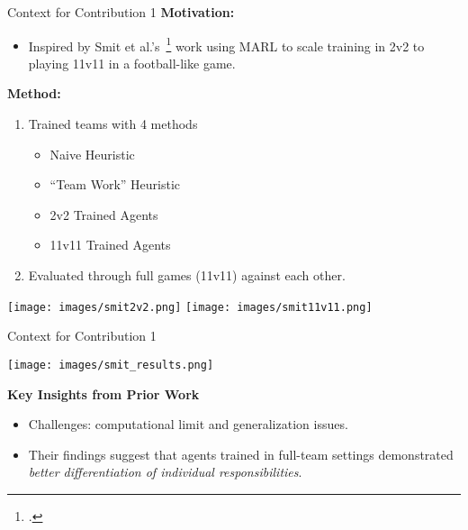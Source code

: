\documentclass[xcolor={svgnames}]{beamer}
\begin{document}
\begin{frame}{Context for Contribution 1}
    \textbf{Motivation:}
    \begin{itemize}
        \item Inspired by Smit et al.'s~\footcite{smit2023} 
        work using MARL to scale training in 2v2 to playing 11v11 in a football-like game.
    \end{itemize}

    \begin{multicols}{2}
        \textbf{Method:}
        \begin{enumerate}
            \item Trained teams with 4 methods
            \begin{itemize}
                \item Naive Heuristic
                \item ``Team Work'' Heuristic
                \item 2v2 Trained Agents
                \item 11v11 Trained Agents
            \end{itemize}
            \item Evaluated through full games (11v11) against each other.
        \end{enumerate}

        \vfil

        \begin{center}
            \texttt{[image: images/smit2v2.png]}
            \texttt{[image: images/smit11v11.png]}
        \end{center}
    \end{multicols}
\end{frame}


\begin{frame}{Context for Contribution 1}
    \begin{table}
        \centering
        \texttt{[image: images/smit\_results.png]}
        \captionsetup{width=.75\linewidth}
        \caption{\footnotesize Win rate of row teams vs column teams;
            500 games of 11v11.~\footcite{smit2023}}
        \label{table:smit_winrates}
    \end{table}

    \textbf{Key Insights from Prior Work}
    \begin{itemize}
        \item Challenges: computational limit and generalization issues.
        \item Their findings suggest that agents trained in full-team settings demonstrated 
            \emph{better differentiation of individual responsibilities}.
    \end{itemize}
\end{frame}
\end{document}
